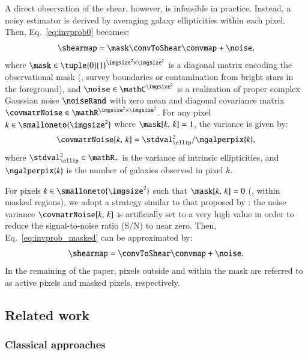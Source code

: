\documentclass{aa}
\begin{document}
A direct observation of the shear, however, is infeasible in practice. Instead, a noisy estimator is derived by averaging galaxy ellipticities within each pixel. Then, Eq.~\eqref{eq:invprob0} becomes:
\begin{equation}
    \shearmap = \mask\convToShear \convmap + \noise,
\label{eq:invprob_masked}
\end{equation}
where $\mask \in \tuple{0}{1}^{\imgsize^2 \times \imgsize^2}$ is a diagonal matrix encoding the observational mask (\eg, survey boundaries or contamination from bright stars in the foreground), and $\noise \in \mathC^{\imgsize^2}$ is a realization of proper complex Gaussian noise $\noiseRand$ with zero mean and diagonal covariance matrix $\covmatrNoise \in \mathR^{\imgsize^2 \times \imgsize^2}$. For any pixel $k \in \smalloneto{\imgsize^2}$ where $\mask[k,\, k] = 1$, the variance is given by:
\begin{equation}
    \covmatrNoise[k,\, k] = \stdval_{\ellip}^2 / \ngalperpix{k},
\label{eq:covmatrnoise}
\end{equation}
where $\stdval_{\ellip}^2 \in \mathR_+$ is the variance of intrinsic ellipticities, and $\ngalperpix{k}$ is the number of galaxies observed in pixel $k$.

For pixels $k \in \smalloneto{\imgsize^2}$ such that $\mask[k,\, k] = 0$ (\ie, within masked regions), we adopt a strategy similar to that proposed by \citet{Starck2021,Remy2023} \tocheck: the noise variance $\covmatrNoise[k,\, k]$ is artificially set to a very high value in order to reduce the signal-to-noise ratio (S/N) to near zero.
Then, Eq.~\eqref{eq:invprob_masked} can be approximated by:
\begin{equation}
    \shearmap = \convToShear \convmap + \noise.
\label{eq:invprob}
\end{equation}
In the remaining of the paper, pixels outside and within the mask are referred to as active pixels and masked pixels, respectively.

\subsection{Related work}
\label{subsec:background_relatedwork}

\subsubsection{Classical approaches}
\label{subsubsec:background_relatedwork_classical}
\end{document}
